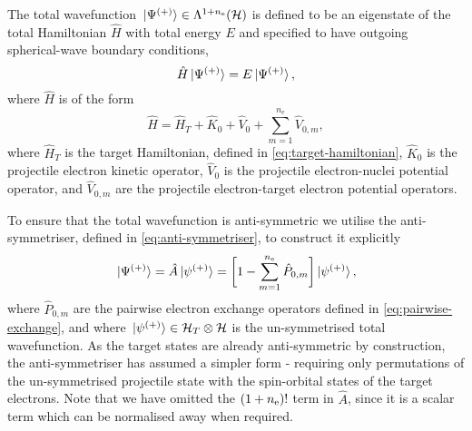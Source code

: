 \documentclass[draft]{article}
\begin{document}
The total wavefunction
$\ket*{\Psi^{(+)}} \in \Lambda^{1 + n_{\mathrm{e}}}(\mathcal{H})$ is
defined to be an eigenstate of the total Hamiltonian $\hat{H}$ with total
energy $E$ and specified to have outgoing spherical-wave boundary conditions,
\begin{equation}
  \label{eq:total-wavefunction}
  \hat{H}
  \ket*{\Psi^{\lr{+}}}
  =
  E
  \ket*{\Psi^{\lr{+}}}
  ,
\end{equation}
where $\hat{H}$ is of the form
\begin{equation}
  \label{eq:total-hamiltonian}
  \hat{H}
  =
  \hat{H}_{T}
  +
  \hat{K}_{0}
  +
  \hat{V}_{0}
  +
  \sum_{m = 1}^{n_{\mathrm{e}}}
  \hat{V}_{0, m}
  ,
\end{equation}
where $\hat{H}_{T}$ is the target Hamiltonian, defined in
\autoref{eq:target-hamiltonian}, $\hat{K}_{0}$ is the projectile electron
kinetic operator, $\hat{V}_{0}$ is the projectile electron-nuclei potential
operator, and $\hat{V}_{0, m}$ are the projectile electron-target electron
potential operators.

To ensure that the total wavefunction is anti-symmetric we utilise the
anti-symmetriser, defined in \autoref{eq:anti-symmetriser}, to construct it
explicitly
\begin{equation}
  \label{eq:total-wavefunction-antisymmetrisation}
  \ket*{\Psi^{\lr{+}}}
  =
  \hat{A}
  \ket*{\psi^{\lr{+}}}
  =
  \lrsq[\bigg]
  {
    1
    -
    \sum_{m = 1}^{n_{\mathrm{e}}}
    \hat{P}_{0, m}
  }
  \ket*{\psi^{\lr{+}}}
  ,
\end{equation}
where $\hat{P}_{0, m}$ are the pairwise electron exchange operators defined in
\autoref{eq:pairwise-exchange}, and where
$\ket*{\psi^{(+)}} \in \mathcal{H}_{T} \otimes \mathcal{H}$ is the
un-symmetrised total wavefunction.
As the target states are already anti-symmetric by construction, the
anti-symmetriser has assumed a simpler form - requiring only permutations
of the un-symmetrised projectile state with the spin-orbital states of the
target electrons.
Note that we have omitted the $(1 + n_{\mathrm{e}})!$ term in $\hat{A}$,
since it is a scalar term which can be normalised away when required.
\end{document}

